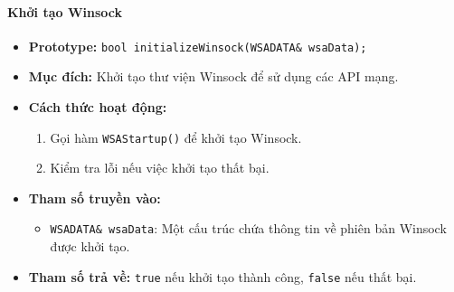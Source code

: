 \paragraph{\textbf{Khởi tạo Winsock}}
\begin{itemize}
    \item \textbf{Prototype:} \texttt{bool initializeWinsock(WSADATA\& wsaData);}
    
    \item \textbf{Mục đích:} Khởi tạo thư viện Winsock để sử dụng các API mạng.
    
    \item \textbf{Cách thức hoạt động:} 
    \begin{enumerate}
        \item Gọi hàm \texttt{WSAStartup()} để khởi tạo Winsock.
        \item Kiểm tra lỗi nếu việc khởi tạo thất bại.
    \end{enumerate}
    
    \item \textbf{Tham số truyền vào:} 
    \begin{itemize}
        \item \texttt{WSADATA\& wsaData}: Một cấu trúc chứa thông tin về phiên bản Winsock được khởi tạo.
    \end{itemize}
    
    \item \textbf{Tham số trả về:} \texttt{true} nếu khởi tạo thành công, \texttt{false} nếu thất bại.
\end{itemize}

